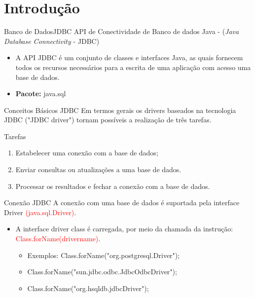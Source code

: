 \documentclass[11pt,aspectratio=43,ignorenonframetext,t]{beamer}
\begin{document}
\section{Introdução}
\begin{frame}{Banco de Dados}{JDBC}
  API de Conectividade de Banco de dados Java - (\textit{Java Database 
    Connectivity} - JDBC)
  \begin{itemize}
   \item A API JDBC é um conjunto de classes e interfaces Java, as quais 
fornecem todos os recursos necessários para a escrita de uma aplicação com 
acesso uma base de dados.
    \item \textbf{Pacote:} java.sql
  \end{itemize}
\end{frame}
\begin{frame}{Conceitos Básicos JDBC}
  Em termos gerais os drivers baseados na tecnologia JDBC ("JDBC driver") tornam 
possíveis a realização de três tarefas.
   \begin{block}{Tarefas}
    \begin{enumerate}
     \item Estabelecer uma conexão com a base de dados;
     \item Enviar consultas ou atualizações a uma base de dados.
    \item Processar os resultados e fechar a conexão com a base de dados.
    \end{enumerate}
   \end{block}
\end{frame}
\begin{frame}{Conexão JDBC}
  A conexão com uma base de dados é suportada pela interface Driver 
  \textcolor{red}{(java.sql.Driver)}.
  \begin{itemize}
    \item A interface driver class é carregada, por meio da chamada da 
    instrução: \textcolor{red}{Class.forName(drivername)}.
    \begin{itemize}
     \item Exemplos: Class.forName("org.postgresql.Driver");
     \item Class.forName("sun.jdbc.odbc.JdbcOdbcDriver");
     \item Class.forName("org.hsqldb.jdbcDriver");
    \end{itemize}
   \end{itemize}
\end{frame}
\end{document}
